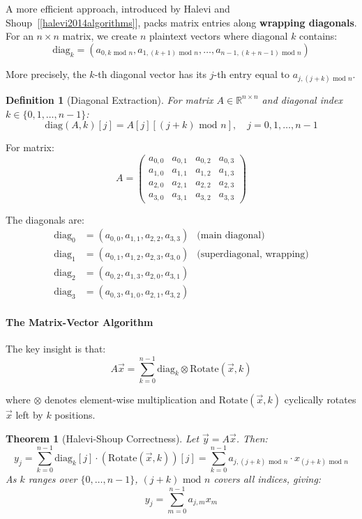 \documentclass[11pt,a4paper]{article}
\newtheorem{definition}{Definition}
\newtheorem{theorem}{Theorem}
\newcommand{\bmod}{\text{ mod }}
\begin{document}
A more efficient approach, introduced by Halevi and Shoup~[\ref{halevi2014algorithms}], packs matrix entries along \textbf{wrapping diagonals}. For an $n \times n$ matrix, we create $n$ plaintext vectors where diagonal $k$ contains:
\[
\text{diag}_k = (a_{0,k \bmod n}, a_{1,(k+1) \bmod n}, \ldots, a_{n-1,(k+n-1) \bmod n})
\]

More precisely, the $k$-th diagonal vector has its $j$-th entry equal to $a_{j, (j+k) \bmod n}$.

\begin{definition}[Diagonal Extraction]
For matrix $A \in \mathbb{R}^{n \times n}$ and diagonal index $k \in \{0, 1, \ldots, n-1\}$:
\[
\text{diag}(A, k)[j] = A[j][(j+k) \bmod n], \quad j = 0, 1, \ldots, n-1
\]
\end{definition}

\begin{example}[Diagonal Packing for $n=4$]
For matrix:
\[
A = \begin{pmatrix}
a_{0,0} & a_{0,1} & a_{0,2} & a_{0,3} \\
a_{1,0} & a_{1,1} & a_{1,2} & a_{1,3} \\
a_{2,0} & a_{2,1} & a_{2,2} & a_{2,3} \\
a_{3,0} & a_{3,1} & a_{3,2} & a_{3,3}
\end{pmatrix}
\]

The diagonals are:
\begin{align*}
\text{diag}_0 &= (a_{0,0}, a_{1,1}, a_{2,2}, a_{3,3}) & \text{(main diagonal)} \\
\text{diag}_1 &= (a_{0,1}, a_{1,2}, a_{2,3}, a_{3,0}) & \text{(superdiagonal, wrapping)} \\
\text{diag}_2 &= (a_{0,2}, a_{1,3}, a_{2,0}, a_{3,1}) \\
\text{diag}_3 &= (a_{0,3}, a_{1,0}, a_{2,1}, a_{3,2})
\end{align*}
\end{example}

\paragraph{The Matrix-Vector Algorithm}

The key insight is that:
\[
A\vec{x} = \sum_{k=0}^{n-1} \text{diag}_k \otimes \text{Rotate}(\vec{x}, k)
\]

where $\otimes$ denotes element-wise multiplication and $\text{Rotate}(\vec{x}, k)$ cyclically rotates $\vec{x}$ left by $k$ positions.

\begin{theorem}[Halevi-Shoup Correctness]
Let $\vec{y} = A\vec{x}$. Then:
\[
y_j = \sum_{k=0}^{n-1} \text{diag}_k[j] \cdot (\text{Rotate}(\vec{x}, k))[j] = \sum_{k=0}^{n-1} a_{j,(j+k) \bmod n} \cdot x_{(j+k) \bmod n}
\]
As $k$ ranges over $\{0, \ldots, n-1\}$, $(j+k) \bmod n$ covers all indices, giving:
\[
y_j = \sum_{m=0}^{n-1} a_{j,m} x_m
\]
\end{theorem}
\end{document}
